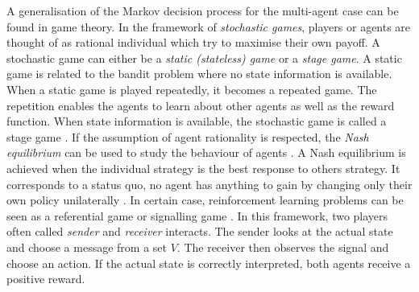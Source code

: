 A generalisation of the Markov decision process for the multi-agent case can be found in game theory. In the framework of \textit{stochastic games}, players or agents are thought of as rational individual which try to maximise their own payoff. A stochastic game can either be a \textit{static (stateless) game} or a \textit{stage game}. A static game is related to the bandit problem where no state information is available. When a static game is played repeatedly, it becomes a repeated game. The repetition enables the agents to learn about other agents as well as the reward function. When state information is available, the stochastic game is called a stage game \cite{busoniu_multi-agent_2010}. If the assumption of agent rationality is respected, the \textit{Nash equilibrium} can be used to study the behaviour of agents \cite{bloembergen_evolutionary_2015}. A Nash equilibrium is achieved when the individual strategy is the best response to others strategy. It corresponds to a status quo, no agent has anything to gain by changing only their own policy unilaterally \cite{busoniu_multi-agent_2010}. In certain case, reinforcement learning problems can be seen as a referential game or signalling game \cite{lewis_convention:_1969}. In this framework, two players often called \textit{sender} and \textit{receiver} interacts. The sender looks at the actual state and choose a message from a set $V$. The receiver then observes the signal and choose an action. If the actual state is correctly interpreted, both agents receive a positive reward.

 
 
 
